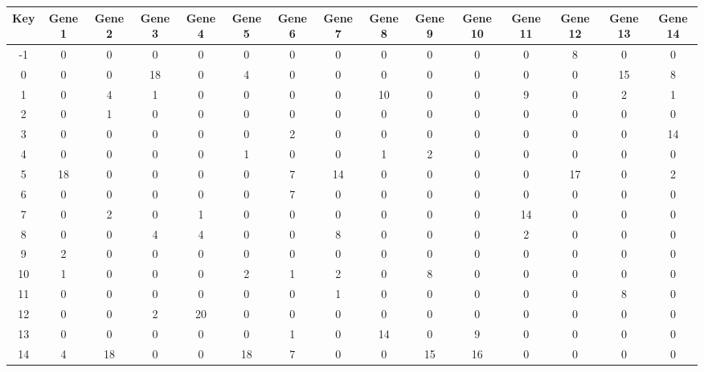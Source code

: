 \begin{tabular}{|c|c|c|c|c|c|c|c|c|c|c|c|c|c|c|}
\hline
Key & Gene 1 & Gene 2 & Gene 3 & Gene 4 & Gene 5 & Gene 6 & Gene 7 & Gene 8 & Gene 9 & Gene 10 & Gene 11 & Gene 12 & Gene 13 & Gene 14 \\
\hline
-1 & 0 & 0 & 0 & 0 & 0 & 0 & 0 & 0 & 0 & 0 & 0 & 8 & 0 & 0 \\
0 & 0 & 0 & 18 & 0 & 4 & 0 & 0 & 0 & 0 & 0 & 0 & 0 & 15 & 8 \\
1 & 0 & 4 & 1 & 0 & 0 & 0 & 0 & 10 & 0 & 0 & 9 & 0 & 2 & 1 \\
2 & 0 & 1 & 0 & 0 & 0 & 0 & 0 & 0 & 0 & 0 & 0 & 0 & 0 & 0 \\
3 & 0 & 0 & 0 & 0 & 0 & 2 & 0 & 0 & 0 & 0 & 0 & 0 & 0 & 14 \\
4 & 0 & 0 & 0 & 0 & 1 & 0 & 0 & 1 & 2 & 0 & 0 & 0 & 0 & 0 \\
5 & 18 & 0 & 0 & 0 & 0 & 7 & 14 & 0 & 0 & 0 & 0 & 17 & 0 & 2 \\
6 & 0 & 0 & 0 & 0 & 0 & 7 & 0 & 0 & 0 & 0 & 0 & 0 & 0 & 0 \\
7 & 0 & 2 & 0 & 1 & 0 & 0 & 0 & 0 & 0 & 0 & 14 & 0 & 0 & 0 \\
8 & 0 & 0 & 4 & 4 & 0 & 0 & 8 & 0 & 0 & 0 & 2 & 0 & 0 & 0 \\
9 & 2 & 0 & 0 & 0 & 0 & 0 & 0 & 0 & 0 & 0 & 0 & 0 & 0 & 0 \\
10 & 1 & 0 & 0 & 0 & 2 & 1 & 2 & 0 & 8 & 0 & 0 & 0 & 0 & 0 \\
11 & 0 & 0 & 0 & 0 & 0 & 0 & 1 & 0 & 0 & 0 & 0 & 0 & 8 & 0 \\
12 & 0 & 0 & 2 & 20 & 0 & 0 & 0 & 0 & 0 & 0 & 0 & 0 & 0 & 0 \\
13 & 0 & 0 & 0 & 0 & 0 & 1 & 0 & 14 & 0 & 9 & 0 & 0 & 0 & 0 \\
14 & 4 & 18 & 0 & 0 & 18 & 7 & 0 & 0 & 15 & 16 & 0 & 0 & 0 & 0 \\
\hline
\end{tabular}